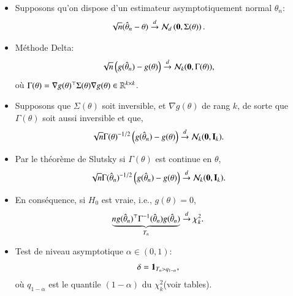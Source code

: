 \begin{frame}
\begin{itemize}
    \framebreak 
    \item Supposons qu'on dispose d'un estimateur asymptotiquement normal $\hat{\theta}_n$: \begin{align*}
        \sqrt{n}(\hat{\theta}_n  - \theta)&\overset{d}{\rightarrow} \mathcal{N}_d\left({\mathbf 0}, \Sigma(\theta)\right).
    \end{align*}
    \item Méthode Delta: \begin{align*}
        \sqrt{n}\left(g(\hat{\theta}_n) - g(\theta)\right)&\overset{d}{\rightarrow} \mathcal{N}_k({\mathbf 0}, \Gamma(\theta)),
    \end{align*}
    où $\Gamma(\theta) = \nabla g(\theta)^\top \Sigma(\theta)\nabla g(\theta)\in\mathbb{R}^{k\times k}$.
    \item Supposons que $\Sigma(\theta)$ soit inversible, et $\nabla g(\theta)$ de rang $k$, de sorte que $\Gamma(\theta)$ 
    soit aussi inversible et que, 
    \begin{align*}
        \sqrt{n} \Gamma(\theta)^{-1/2}\left(g(\hat{\theta}_n) - g(\theta)\right)&\overset{d}{\rightarrow} \mathcal{N}_k({\mathbf 0}, \mathbf{I}_k).
    \end{align*}
    \framebreak
    \item Par le théorème de Slutsky si $\Gamma(\theta)$ est continue en $\theta$,
    \begin{align*}
        \sqrt{n} \Gamma(\hat{\theta}_n)^{-1/2}\left(g(\hat{\theta}_n )- g(\theta)\right)&\overset{d}{\rightarrow} \mathcal{N}_k({\mathbf 0}, \mathbf{I}_k).
    \end{align*}
    \item En conséquence, si $H_0$ est vraie, i.e., $g(\theta) = 0$,
    \begin{align*}
        \underbrace{n g(\hat{\theta}_n)^\top \Gamma^{-1}(\hat{\theta}_n)g(\hat{\theta}_n)}_{T_n} &\overset{d}{\rightarrow} \chi^2_k.
    \end{align*}
    \item Test de niveau asymptotique $\alpha\in(0, 1)$: 
    \begin{align*}
        \delta &=\mathbf{1}_{T_n > q_{1-\alpha}},
    \end{align*}
    où $q_{1-\alpha}$ est le quantile $(1-\alpha)$ du $\chi^2_k$(voir tables).
    \end{itemize}
\end{frame}
